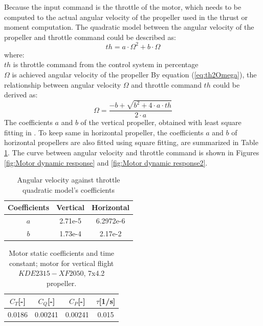 Because the input command is the throttle of the motor, which needs to be computed to the actual angular velocity of the propeller used in the thrust or moment computation. The quadratic model between the angular velocity of the propeller and throttle command could be described as:
\begin{equation}
    th = a \cdot \Omega^2 + b \cdot \Omega \label{eq:th2Omega}
\end{equation}
where: \\
\(th\) is throttle command from the control system in percentage\\
\(\Omega\) is achieved angular velocity of the propeller
By equation (\ref{eq:th2Omega}), the relationship between angular velocity \( \Omega \) and throttle command \( th \) could be derived as:
\begin{equation}
    \Omega = \frac{- b + \sqrt{ b ^ 2 + 4 \cdot a \cdot th }}{2 \cdot a}
\end{equation}
The coefficients \( a \) and \( b \) of the vertical propeller, obtained with least square fitting in \cite{battaini2022}. To keep same in horizontal propeller, the coefficients \( a \) and \( b \) of horizontal propellers are also fitted using square fitting, are summarized in Table \ref{tab:Angular velocity against throttle quadratic model’s coefficients}. The curve between angular velocity and throttle command is shown in Figures \ref{fig:Motor dynamic response} and \ref{fig:Motor dynamic response2}.

\begin{table}[h]
    \centering
    \begin{tabular}{ccc}
        \hline
        Coefficients & Vertical & Horizontal \\
        \hline
        \( a \) & 2.71e-5 & 6.2972e-6 \\
        \( b \) & 1.73e-4 & 2.17e-2 \\
        \hline
    \end{tabular}
    \caption{Angular velocity against throttle quadratic model’s coefficients}
    \label{tab:Angular velocity against throttle quadratic model’s coefficients}
\end{table}

\begin{table}
    \centering
    \begin{tabular}{cccc}
    \hline
        $C_T$[-] & $C_Q$[-] & $C_P$[-] & $\tau$[1/s] \\
    \hline
        0.0186 & 0.00241 & 0.00241 & 0.015 \\
    \hline
    \end{tabular}
    \caption{Motor static coefficients and time constant; motor for vertical flight $KDE2315-XF2050$, 7x4.2 propeller.}
    \label{tab:Motor static coefficients}
\end{table}

